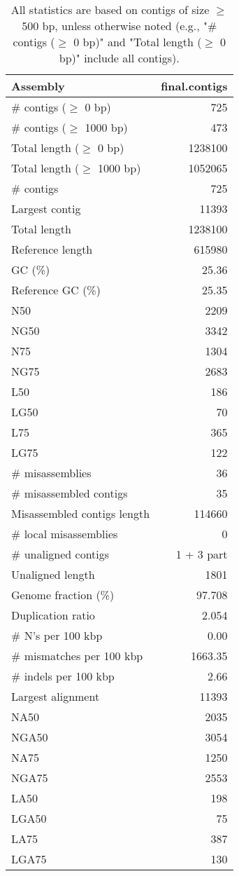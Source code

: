 \documentclass[12pt,a4paper]{article}
\begin{document}
\begin{table}[ht]
\begin{center}
\caption{All statistics are based on contigs of size $\geq$ 500 bp, unless otherwise noted (e.g., "\# contigs ($\geq$ 0 bp)" and "Total length ($\geq$ 0 bp)" include all contigs).}
\begin{tabular}{|l*{1}{|r}|}
\hline
Assembly & final.contigs \\ \hline
\# contigs ($\geq$ 0 bp) & 725 \\ \hline
\# contigs ($\geq$ 1000 bp) & 473 \\ \hline
Total length ($\geq$ 0 bp) & 1238100 \\ \hline
Total length ($\geq$ 1000 bp) & 1052065 \\ \hline
\# contigs & 725 \\ \hline
Largest contig & 11393 \\ \hline
Total length & 1238100 \\ \hline
Reference length & 615980 \\ \hline
GC (\%) & 25.36 \\ \hline
Reference GC (\%) & 25.35 \\ \hline
N50 & 2209 \\ \hline
NG50 & 3342 \\ \hline
N75 & 1304 \\ \hline
NG75 & 2683 \\ \hline
L50 & 186 \\ \hline
LG50 & 70 \\ \hline
L75 & 365 \\ \hline
LG75 & 122 \\ \hline
\# misassemblies & 36 \\ \hline
\# misassembled contigs & 35 \\ \hline
Misassembled contigs length & 114660 \\ \hline
\# local misassemblies & 0 \\ \hline
\# unaligned contigs & 1 + 3 part \\ \hline
Unaligned length & 1801 \\ \hline
Genome fraction (\%) & 97.708 \\ \hline
Duplication ratio & 2.054 \\ \hline
\# N's per 100 kbp & 0.00 \\ \hline
\# mismatches per 100 kbp & 1663.35 \\ \hline
\# indels per 100 kbp & 2.66 \\ \hline
Largest alignment & 11393 \\ \hline
NA50 & 2035 \\ \hline
NGA50 & 3054 \\ \hline
NA75 & 1250 \\ \hline
NGA75 & 2553 \\ \hline
LA50 & 198 \\ \hline
LGA50 & 75 \\ \hline
LA75 & 387 \\ \hline
LGA75 & 130 \\ \hline
\end{tabular}
\end{center}
\end{table}
\end{document}
